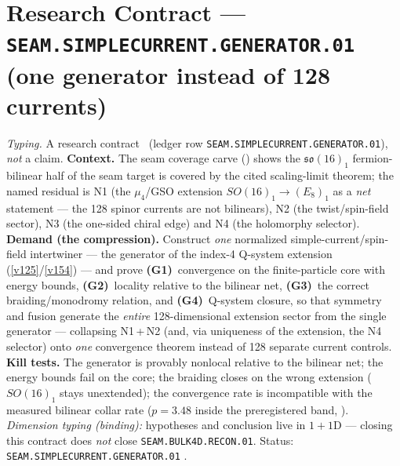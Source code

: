 \documentclass[11pt,a4paper]{article}
\begin{document}
\section*{Research Contract --- \texttt{SEAM.SIMPLECURRENT.GENERATOR.01} (one generator instead of 128 currents)}
\noindent\emph{Typing.} A research contract \mO\ (ledger row
\texttt{SEAM.SIMPLECURRENT.GENERATOR.01}), \emph{not} a claim.  \textbf{Context.}  The seam
coverage carve () shows the $\mathfrak{so}(16)_1$
fermion-bilinear half of the seam target is covered by the cited scaling-limit theorem; the
named residual is N1 (the $\mu_4$/GSO extension $SO(16)_1\to(E_8)_1$ as a \emph{net} statement
--- the 128 spinor currents are not bilinears), N2 (the twist/spin-field sector), N3 (the
one-sided chiral edge) and N4 (the holomorphy selector).  \textbf{Demand (the compression).}
Construct \emph{one} normalized simple-current/spin-field intertwiner --- the generator of the
index-4 Q-system extension (\vref{v125}/\vref{v154}) --- and prove
\textbf{(G1)}~convergence on the finite-particle core with energy bounds,
\textbf{(G2)}~locality relative to the bilinear net,
\textbf{(G3)}~the correct braiding/monodromy relation, and
\textbf{(G4)}~Q-system closure,
so that symmetry and fusion generate the \emph{entire} 128-dimensional extension sector from the
single generator --- collapsing N1\,+\,N2 (and, via uniqueness of the extension, the N4
selector) onto \emph{one} convergence theorem instead of 128 separate current controls.
\textbf{Kill tests.}  The generator is provably nonlocal relative to the bilinear net; the
energy bounds fail on the core; the braiding closes on the wrong extension ($SO(16)_1$ stays
unextended); the convergence rate is incompatible with the measured bilinear collar rate
($p=3.48$ inside the preregistered band, ).
\emph{Dimension typing (binding):} hypotheses and conclusion live in $1{+}1$D --- closing this
contract does \emph{not} close \texttt{SEAM.BULK4D.RECON.01}.  Status:
\texttt{SEAM.SIMPLECURRENT.GENERATOR.01} \mO.
\end{document}
